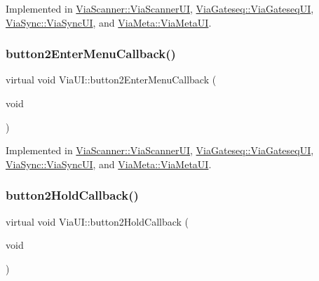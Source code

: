 Implemented in \mbox{\hyperlink{class_via_scanner_1_1_via_scanner_u_i_a0347e038aa4ac6c8e7e9f50272cc19d8}{Via\+Scanner\+::\+Via\+Scanner\+UI}}, \mbox{\hyperlink{class_via_gateseq_1_1_via_gateseq_u_i_ac5e0a6f47606f0f41860fd797a004b1f}{Via\+Gateseq\+::\+Via\+Gateseq\+UI}}, \mbox{\hyperlink{class_via_sync_1_1_via_sync_u_i_adbf5a730f6f3986d7f787c9ac1f41cb3}{Via\+Sync\+::\+Via\+Sync\+UI}}, and \mbox{\hyperlink{class_via_meta_1_1_via_meta_u_i_af36b9d43b3a7e014650825c81fcf5893}{Via\+Meta\+::\+Via\+Meta\+UI}}.

\mbox{\label{class_via_u_i_ac7b7f919edba9a640e7009e1f9303a2d}} 
\subsubsection{\texorpdfstring{button2\+Enter\+Menu\+Callback()}{button2EnterMenuCallback()}}
{\footnotesize\ttfamily virtual void Via\+U\+I\+::button2\+Enter\+Menu\+Callback (\begin{DoxyParamCaption}\item[{void}]{ }\end{DoxyParamCaption})\hspace{0.3cm}{\ttfamily [pure virtual]}}



Implemented in \mbox{\hyperlink{class_via_scanner_1_1_via_scanner_u_i_acb45c99dcac36f93d98621f6c53c9a0a}{Via\+Scanner\+::\+Via\+Scanner\+UI}}, \mbox{\hyperlink{class_via_gateseq_1_1_via_gateseq_u_i_ae0e3038febadb4cde08ff0f3da2703fe}{Via\+Gateseq\+::\+Via\+Gateseq\+UI}}, \mbox{\hyperlink{class_via_sync_1_1_via_sync_u_i_a92bc4b1308d5994bef5989a8e975321d}{Via\+Sync\+::\+Via\+Sync\+UI}}, and \mbox{\hyperlink{class_via_meta_1_1_via_meta_u_i_a5687d94232ddf1b109a5f48c8ef89650}{Via\+Meta\+::\+Via\+Meta\+UI}}.

\mbox{\label{class_via_u_i_a95bce2d662a8ae46be73497e868aebb9}} 
\subsubsection{\texorpdfstring{button2\+Hold\+Callback()}{button2HoldCallback()}}
{\footnotesize\ttfamily virtual void Via\+U\+I\+::button2\+Hold\+Callback (\begin{DoxyParamCaption}\item[{void}]{ }\end{DoxyParamCaption})\hspace{0.3cm}{\ttfamily [pure virtual]}}



